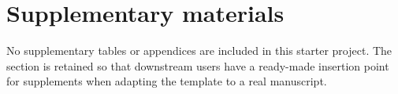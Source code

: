 \section{Supplementary materials}
No supplementary tables or appendices are included in this starter
project. The section is retained so that downstream users have a
ready-made insertion point for supplements when adapting the template to
a real manuscript.
